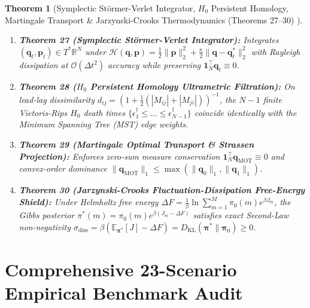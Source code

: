 \documentclass[10pt,a4paper]{article}
\newtheorem{theorem}{Theorem}[section]
\begin{document}
\begin{theorem}[Symplectic Störmer-Verlet Integrator, $H_0$ Persistent Homology, Martingale Transport \& Jarzynski-Crooks Thermodynamics (Theorems 27--30) \cite{hairer2006,carlsson2009,beiglbock2013,jarzynski1997}]
\leavevmode
\begin{enumerate}\setlength{\itemsep}{1pt}\setlength{\parskip}{0pt}
  \item \textbf{Theorem 27 (Symplectic Störmer-Verlet Integrator):} Integrates $(\mathbf{q}_t, \mathbf{p}_t) \in T^*\mathbb{R}^N$ under $\mathcal{H}(\mathbf{q}, \mathbf{p}) = \frac{1}{2}\|\mathbf{p}\|_2^2 + \frac{\kappa}{2}\|\mathbf{q} - \mathbf{q}_t^*\|_2^2$ with Rayleigh dissipation at $\mathcal{O}(\Delta t^2)$ accuracy while preserving $\mathbf{1}_N^\top \mathbf{q}_t \equiv 0$.
  \item \textbf{Theorem 28 ($H_0$ Persistent Homology Ultrametric Filtration):} On lead-lag dissimilarity $d_{ij} = (1 + \frac{1}{2}(|M_{ij}| + |M_{ji}|))^{-1}$, the $N-1$ finite Vietoris-Rips $H_0$ death times $\{\epsilon_1^\dagger \le \dots \le \epsilon_{N-1}^\dagger\}$ coincide identically with the Minimum Spanning Tree (MST) edge weights.
  \item \textbf{Theorem 29 (Martingale Optimal Transport \& Strassen Projection):} Enforces zero-sum measure conservation $\mathbf{1}_N^\top \mathbf{q}_{\mathrm{MOT}} \equiv 0$ and convex-order dominance $\|\mathbf{q}_{\mathrm{MOT}}\|_1 \le \max(\|\mathbf{q}_0\|_1, \|\mathbf{q}_1\|_1)$.
  \item \textbf{Theorem 30 (Jarzynski-Crooks Fluctuation-Dissipation Free-Energy Shield):} Under Helmholtz free energy $\Delta F = \frac{1}{\beta}\ln \sum_{m=1}^M \pi_0(m) e^{\beta J_m}$, the Gibbs posterior $\pi^*(m) = \pi_0(m) e^{\beta(J_m - \Delta F)}$ satisfies exact Second-Law non-negativity $\sigma_{\mathrm{diss}} = \beta(\mathbb{E}_{\boldsymbol{\pi}^*}[J] - \Delta F) = D_{\mathrm{KL}}(\boldsymbol{\pi}^* \| \boldsymbol{\pi}_0) \ge 0$.
\end{enumerate}
\end{theorem}

\section{Comprehensive 23-Scenario Empirical Benchmark Audit}
\end{document}
